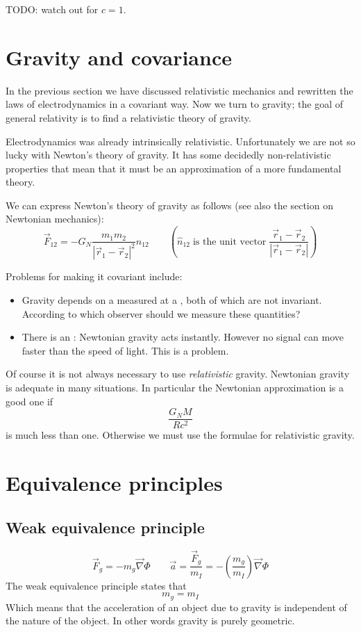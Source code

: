 TODO: watch out for $c=1$.

\chapter{Gravity and covariance}
In the previous section we have discussed relativistic mechanics and rewritten the laws of electrodynamics in a covariant way. Now we turn to gravity; the goal of general relativity is to find a relativistic theory of gravity.

Electrodynamics was already intrinsically relativistic. Unfortunately we are not so lucky with Newton's theory of gravity. It has some decidedly non-relativistic properties that mean that it must be an approximation of a more fundamental theory.

We can express Newton's theory of gravity as follows (see also the section on Newtonian mechanics):
\[ \vec{F}_{12} = -G_N \frac{m_1m_2}{|\vec{r}_1 - \vec{r}_2|^2} \hat{n}_{12} \qquad \left(\hat{n}_{12} \; \text{is the unit vector} \; \frac{\vec{r}_1 - \vec{r}_2}{|\vec{r}_1 - \vec{r}_2|}\right) \]

Problems for making it covariant include:
\begin{itemize}
\item Gravity depends on a  measured at a , both of which are not invariant. According to which observer should we measure these quantities?
\item There is an : Newtonian gravity acts instantly. However no signal can move faster than the speed of light. This is a problem. 
\end{itemize}

Of course it is not always necessary to use \emph{relativistic} gravity. Newtonian gravity is adequate in many situations. In particular the Newtonian approximation is a good one if
\[ \frac{G_NM}{Rc^2} \]
is much less than one. Otherwise we must use the formulae for relativistic gravity.

\chapter{Equivalence principles}
\section{Weak equivalence principle}
\[ \vec{F}_g = -m_g \vec{\nabla}\Phi \qquad \vec{a}= \frac{\vec{F}_g}{m_I} = -\left(\frac{m_g}{m_I}\right)\vec{\nabla}\Phi \]
The weak equivalence principle states that
\[ m_g = m_I \]
Which means that the acceleration of an object due to gravity is independent of the nature of the object. In other words gravity is purely geometric.

